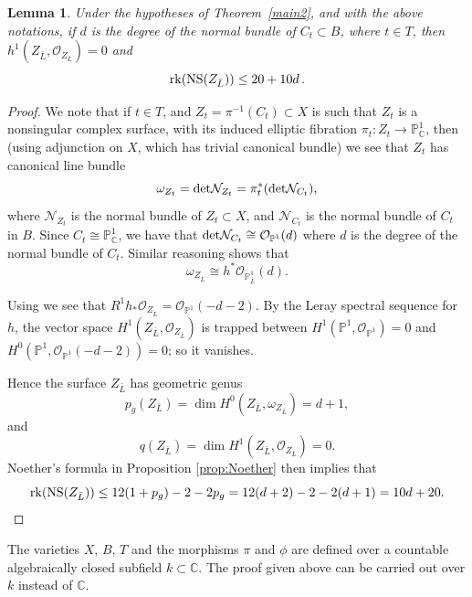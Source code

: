 \documentclass[11pt]{amsart}
\newtheorem{lemma}[theorem]{Lemma}
\theoremstyle{definition}
\theoremstyle{definition}
\theoremstyle{remark}
\theoremstyle{remark}
\theoremstyle{definition}
\theoremstyle{conjecture}
\newcommand{\NS}{\mathrm{NS}}
\begin{document}
\begin{lemma} \label{eq:rkNS-1}
Under the hypotheses of Theorem~\ref{main2}, and with the above notations,
if $d$ is the degree of the normal bundle of $C_t\subset B$, where $t\in T$,
then 
$h^1(Z_{\bar{L}},{\mathcal O}_{Z_{\bar{L}}})=0$ and
\color{black}
\[
{\rm rk}(\NS(Z_{\bar L})) \leq 20 +10d \,.
\]
\end{lemma}
\begin{proof}
We note that if $t\in T$, and $Z_t=\pi^{-1}(C_t)\subset X$
is such that $Z_t$ is a nonsingular complex surface,
with its induced elliptic fibration $\pi_t:Z_t\to{\mathbb P}^1_{\mathbb C}$,
then (using adjunction on $X$, which has trivial canonical bundle) we see that
$Z_t$ has canonical line bundle
\[
\omega_{Z_t}={\rm det}{\mathcal N_{Z_t}} = \pi_t^*({\rm det}{\mathcal N}_{C_t}),
\]
where ${\mathcal N}_{Z_t}$ is the normal bundle of $Z_t\subset X$,
and ${\mathcal N}_{C_t}$ is the normal bundle of $C_t$ in $B$.
Since $C_t\cong {\mathbb P}^1_{\mathbb C}$,
we have that ${\rm det}{\mathcal N}_{C_t}\cong {\mathcal O}_{{\mathbb P}^1}(d)$
where $d$ is the degree of the normal bundle of $C_t$.
Similar reasoning shows that
\[
\omega_{Z_{\bar{L}}}\cong h^*{\mathcal O}_{{\mathbb P}^1_{\bar{L}}}(d).
\]

Using \cite[Corollary 2.4(iv)]{M} we see that
    $R^1h_*\mathcal{O}_{Z_{\bar{L}}}=\mathcal{O}_{\mathbb{P}^1}(-d-2)$.
By the Leray spectral sequence for $h$, the vector space
$H^1(Z_{\bar{L}},{\mathcal O}_{Z_{\bar{L}}})$ is trapped between
    $H^1(\mathbb{P}^1,\mathcal{O}_{\mathbb{P}^1})=0$ and
    $H^0(\mathbb{P}^1,\mathcal{O}_{\mathbb{P}^1}(-d-2))=0$; so it
    vanishes.
\color{black}

Hence the surface $Z_{\bar{L}}$ has geometric genus
\[
p_g(Z_{\bar{L}})=\dim H^0(Z_{\bar{L}},\omega_{Z_{\bar{L}}})=d+1,
\]
and
\[
q(Z_{\bar{L}})=\dim H^1(Z_{\bar{L}},{\mathcal O}_{Z_{\bar{L}}})=0.
\]
Noether's formula  in Proposition \ref{prop:Noether} then implies that
\[
{\rm rk} (\NS(Z_{\bar{L}}))\leq 12(1+p_g)-2-2p_g=12(d+2)-2-2(d+1)=10d+20.
\]
\end{proof}


The varieties $X$, $B$, $T$ and the morphisms $\pi$ and $\phi$ are
defined over a countable algebraically closed subfield $k\subset \mathbb{C}$.
The proof given above can be carried out over $k$ instead of
$\mathbb{C}$.
 

\smallbreak
\end{document}
